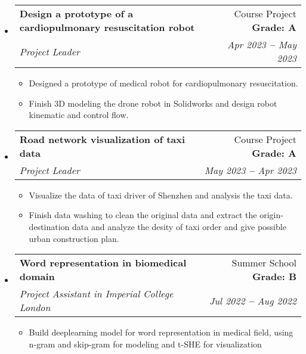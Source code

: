 \documentclass[letterpaper,11pt]{article}
\makeatletter
\newcommand{\resumeItem}[1]{
  \item\small{
    {#1 \vspace{-2pt}}
  }
}
\newcommand{\resumeSubheading}[4]{
  \vspace{-2pt}\item
    \begin{tabular*}{0.97\textwidth}[t]{l@{\extracolsep{\fill}}r}
      \textbf{#1} & #2 \\
      \textit{\small#3} & \textit{\small #4} \\
    \end{tabular*}\vspace{-7pt}
}
\newcommand{\resumeSubHeadingListStart}{\begin{itemize}[leftmargin=0.15in, label={}]}
\newcommand{\resumeSubHeadingListEnd}{\end{itemize}}
\newcommand{\resumeItemListStart}{\begin{itemize}}
\newcommand{\resumeItemListEnd}{\end{itemize}\vspace{-5pt}}
\makeatother
\begin{document}
\resumeSubHeadingListStart

\resumeSubheading {Design a prototype of a
  cardiopulmonary resuscitation robot}{Course Project \textbf{Grade: A}} {Project Leader}{Apr 2023
  \textbf{--}
  May 2023}

\resumeItemListStart

\resumeItem{ Designed a
  prototype of medical robot for cardiopulmonary resuscitation.
}
\resumeItem{
  Finish 3D modeling the drone robot in Solidworks and design robot kinematic and control flow.
}
\resumeItemListEnd

\resumeSubheading {Road network
  visualization of taxi data}{Course Project \textbf{Grade: A}} {Project Leader}{May 2023 \textbf{--}
  Apr 2023}

\resumeItemListStart

\resumeItem{ Visualize the
  data of taxi driver of Shenzhen and analysis the taxi data.
}
\resumeItem{
  Finish data washing to clean the original data and extract the origin-destination data and analyze the desity of taxi order and give possible urban construction plan.}

\resumeItemListEnd

\resumeSubheading
{Word representation in biomedical domain}{Summer School \textbf{Grade: B}}
{Project Assistant in Imperial College London}{Jul 2022 \textbf{--}
  Aug 2022}

\resumeItemListStart

\resumeItem{
  Build deeplearning model for word representation in medical field, using n-gram and skip-gram for modeling and t-SHE for visualization}

\resumeItemListEnd

\resumeSubHeadingListEnd

\end{document}
